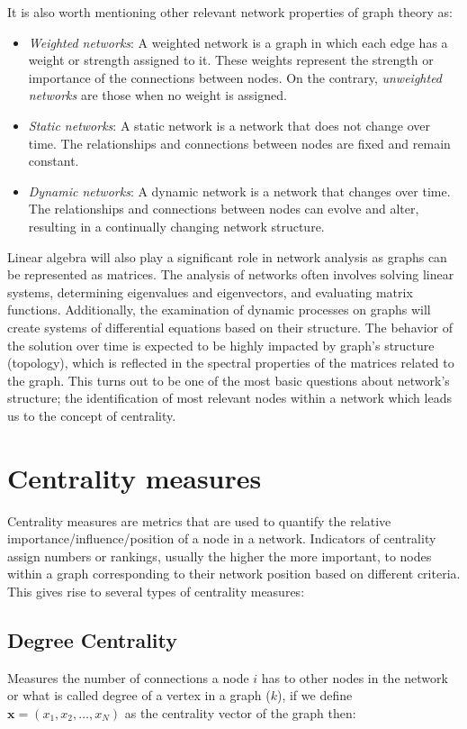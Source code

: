 It is also worth mentioning other relevant network properties of graph theory as:

\begin{itemize}
  \item \textit{Weighted networks}: A weighted network is a graph in which each edge has a weight or strength assigned to it. These weights represent the strength or importance of the connections between nodes. On the contrary, \textit{unweighted networks} are those when no weight is assigned.
  \item \textit{Static networks}: A static network is a network that does not change over time. The relationships and connections between nodes are fixed and remain constant. 
  \item \textit{Dynamic networks}: A dynamic network is a network that changes over time. The relationships and connections between nodes can evolve and alter, resulting in a continually changing network structure.
\end{itemize}

Linear algebra will also play a significant role in network analysis as graphs can be represented as matrices. The analysis of networks often involves solving linear systems, determining eigenvalues and eigenvectors, and evaluating matrix functions. Additionally, the examination of dynamic processes on graphs will create systems of differential equations based on their structure. The behavior of the solution over time is expected to be highly impacted by graph's structure (topology), which is reflected in the spectral properties of the matrices related to the graph. This turns out to be one of the most basic questions about network's structure; the identification of most relevant nodes within a network which leads us to the concept of centrality.

\section{Centrality measures}
\label{sec:centra}
 Centrality measures are metrics that are used to quantify the relative importance/influence/position of a node in a network. Indicators of centrality assign numbers or rankings, usually the higher the more important, to nodes within a graph corresponding to their network position based on different criteria. This gives rise to several types of centrality measures:

\subsection*{Degree Centrality} Measures the number of connections a node $i$ has to other nodes in the network or what is called degree of a vertex in a graph ($k$), if we define $\mathbf{x}=(x_1,x_2,\dots,x_N)$ as the centrality vector of the graph then: 

